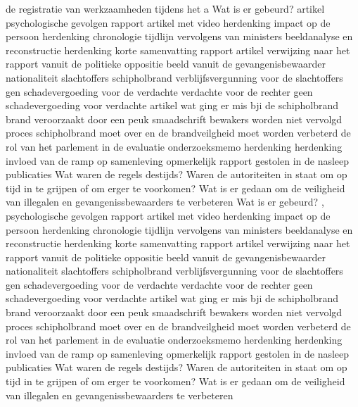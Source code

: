 de registratie van werkzaamheden tijdens het a
Wat is er gebeurd?
\cite{schipholbrand27102005video}
artikel
\cite{schipholbrand27102005video}
psychologische gevolgen
rapport
\cite{onderzoeksraad2610schipholoost}
artikel met video
herdenking
impact op de persoon
herdenking
\cite{schipholbrandvideoargos}
chronologie
\cite{nunl30052023feitenoverzicht}
tijdlijn
vervolgens van ministers
beeldanalyse en reconstructie
\cite{}
herdenking
korte samenvatting
rapport
artikel
verwijzing naar het rapport vanuit de politieke oppositie
beeld vanuit de gevangenisbewaarder
nationaliteit slachtoffers schipholbrand
verblijfsvergunning voor de slachtoffers
gen schadevergoeding voor de verdachte
verdachte voor de rechter
geen schadevergoeding voor verdachte
artikel wat ging er mis bji de schipholbrand
brand veroorzaakt door een peuk
smaadschrift
bewakers worden niet vervolgd
proces schipholbrand moet over en de brandveilgheid moet worden verbeterd
de rol van het parlement in de evaluatie
\cite{parlementairemonitorschipholbrand}
onderzoeksmemo
herdenking
herdenking
invloed van de ramp op samenleving
\cite{videonpoNOVA13112008}
opmerkelijk rapport gestolen in de nasleep
\cite{rizoomes01052014schipholbrand}
publicaties
\cite{heuvelkroesschipholbrandcamerabeelden}
Wat waren de regels destijds?
Waren de autoriteiten in staat om op tijd in te grijpen of om erger te voorkomen?
Wat is er gedaan om de veiligheid van illegalen en gevangenissbewaarders te verbeteren
Wat is er gebeurd?
\cite{wikiSchipholbrand},\cite{schipholbrand27102005video}
 psychologische gevolgen
rapport
\cite{onderzoeksraad2610schipholoost}
artikel met video
herdenking
impact op de persoon
herdenking
\cite{schipholbrandvideoargos}
chronologie
\cite{nunl30052023feitenoverzicht}
tijdlijn
\cite{singeluitgeverijenSchipholbrand}
vervolgens van ministers
beeldanalyse en reconstructie
\cite{eenvandaagschipholbrand}
herdenking
korte samenvatting
rapport
artikel
verwijzing naar het rapport vanuit de politieke oppositie
beeld vanuit de gevangenisbewaarder
nationaliteit slachtoffers schipholbrand
verblijfsvergunning voor de slachtoffers
gen schadevergoeding voor de verdachte
verdachte voor de rechter
geen schadevergoeding voor verdachte
artikel wat ging er mis bji de schipholbrand
brand veroorzaakt door een peuk
smaadschrift
bewakers worden niet vervolgd
proces schipholbrand moet over en de brandveilgheid moet worden verbeterd
de rol van het parlement in de evaluatie
\cite{parlementairemonitorschipholbrand}
onderzoeksmemo
herdenking
herdenking
invloed van de ramp op samenleving
\cite{videonpoNOVA13112008}
opmerkelijk rapport gestolen in de nasleep
\cite{rizoomes01052014schipholbrand}
publicaties
\cite{heuvelkroesschipholbrandcamerabeelden}
Wat waren de regels destijds?
Waren de autoriteiten in staat om op tijd in te grijpen of om erger te voorkomen?
Wat is er gedaan om de veiligheid van illegalen en gevangenissbewaarders te verbeteren

